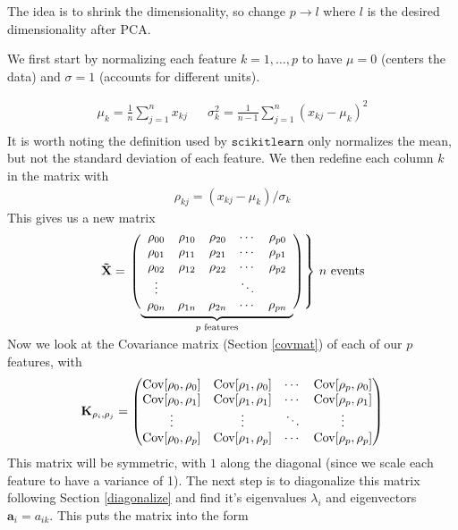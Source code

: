 The idea is to shrink the dimensionality, so change $p\rightarrow l$ where $l$ is the desired dimensionality after PCA. 

We first start by normalizing each feature $k=1,\dots,p$ to have $\mu=0$ (centers the data) and $\sigma=1$ (accounts for different units).

\begin{align}
\mu_k = \frac{1}{n}\sum_{j=1}^n x_{kj} && \sigma_k^2 = \frac{1}{n-1}\sum_{j=1}^n (x_{kj}-\mu_k)^2 \\
\end{align}
It is worth noting the definition used by $\texttt{scikitlearn}$ only normalizes the mean, but not the standard deviation of each feature. We then redefine each column $k$ in the matrix with
\begin{align}
	\rho_{kj} = (x_{kj} - \mu_k)/\sigma_k
\end{align}
This gives us a new matrix
$$\mathbf{\tilde{X}} =  \left.\left( 
                  \vphantom{\begin{array}{c}1\\1\\1\\1\\1\end{array}}
                  \smash{\underbrace{
                      \begin{array}{ccccc}
                             \rho_{00}&\rho_{10}&\rho_{20}&\cdots &\rho_{p0}\\
                             \rho_{01}&\rho_{11}&\rho_{21}&\cdots &\rho_{p1}\\
                             \rho_{02}&\rho_{12}&\rho_{22}&\cdots &\rho_{p2}\\
                             \vdots&&&\ddots&\\
                             \rho_{0n}&\rho_{1n}&\rho_{2n}&\cdots &\rho_{pn}
                      \end{array}
                      }_{p\text{ features}}}
              \right)\right\}
              \,n\text{ events}
$$\\

Now we look at the Covariance matrix (Section \ref{covmat}) of each of our $p$ features, with
\begin{align}
\textbf{K}_{\rho_i,\rho_j} = \begin{pmatrix} 
                             \mathrm{Cov}[\rho_0,\rho_0]&\mathrm{Cov}[\rho_1,\rho_0]&\cdots &\mathrm{Cov}[\rho_p,\rho_0]\\
                             \mathrm{Cov}[\rho_0,\rho_1]&\mathrm{Cov}[\rho_1,\rho_1]&\cdots &\mathrm{Cov}[\rho_p,\rho_1]\\
                             \vdots&\vdots&\ddots&\vdots\\
                             \mathrm{Cov}[\rho_0,\rho_p]&\mathrm{Cov}[\rho_1,\rho_p]&\cdots &\mathrm{Cov}[\rho_p,\rho_p] \end{pmatrix}
\end{align}
This matrix will be symmetric, with $1$ along the diagonal (since we scale each feature to have a variance of 1). The next step is to diagonalize this matrix following Section \ref{diagonalize} and find it's eigenvalues $\lambda_i$ and eigenvectors $\textbf{a}_i = a_{ik}$. This puts the matrix into the form

